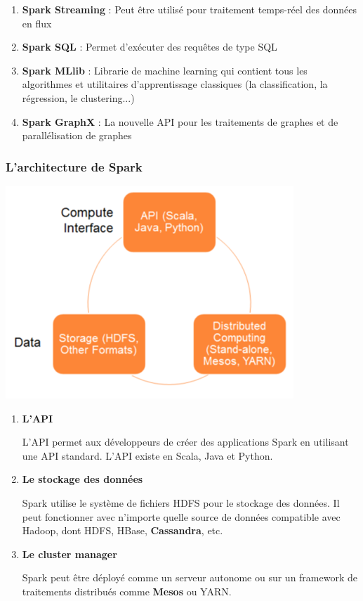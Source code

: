 \documentclass[a4paper, 11pt, titlepage]{article}
\begin{document}
\begin{enumerate}

\item
\textbf{Spark Streaming} : Peut être utilisé pour traitement temps-réel des données en flux

\item
\textbf{Spark SQL} : Permet d'exécuter des requêtes de type SQL

\item
\textbf{Spark MLlib} : Librarie de machine learning qui contient tous les algorithmes et utilitaires d'apprentissage classiques (la classification, la régression, le clustering...)

\item
\textbf{Spark GraphX} : La nouvelle API pour les traitements de graphes et de parallélisation de graphes

\end{enumerate}

\subsubsection* {L'architecture de Spark}

\begin{center}
\includegraphics[scale=0.5]{res/archi_spark.png}
\end{center}


\begin{enumerate}

\item
\textbf{L'API}

L'API permet aux développeurs de créer des applications Spark en utilisant une API standard. L'API existe en Scala, Java et Python.

\item
\textbf{Le stockage des données}

Spark utilise le système de fichiers HDFS pour le stockage des données. Il peut fonctionner avec n'importe quelle source de données compatible avec Hadoop, dont HDFS, HBase, \textbf{Cassandra}, etc.


\item
\textbf{Le cluster manager}

Spark peut être déployé comme un serveur autonome ou sur un framework de traitements distribués comme \textbf{Mesos} ou YARN.

\end{enumerate}
\end{document}
